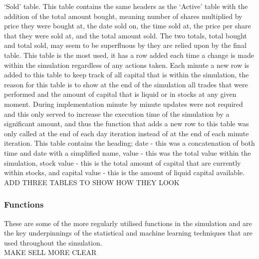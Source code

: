 \documentclass[12pt,a4paper]{article}
\begin{document}
`Sold' table. This table contains the same headers as the `Active' table with the addition of the total amount bought, meaning number of shares multiplied by price they were bought at, the date sold on, the time sold at, the price per share that they were sold at, and the total amount sold. The two totals, total bought and total sold, may seem to be superfluous by they are relied upon by the final table. This table is the most used, it has a row added each time a change is made within the simulation regardless of any actions taken. Each minute a new row is added to this table to keep track of all capital that is within the simulation, the reason for this table is to show at the end of the simulation all trades that were performed and the amount of capital that is liquid or in stocks at any given moment. During implementation minute by minute updates were not required and this only served to increase the execution time of the simulation by a significant amount, and thus the function that adds a new row to this table was only called at the end of each day iteration instead of at the end of each minute iteration. This table contains the heading; date - this was a concatenation of both time and date with a simplified name, value - this was the total value within the simulation, stock value - this is the total amount of capital that are currently within stocks, and capital value - this is the amount of liquid capital available. \\

ADD THREE TABLES TO SHOW HOW THEY LOOK\\
\fi

\subsubsection{Functions}

These are some of the more regularly utilised functions in the simulation and are the key underpinnings of the statistical and machine learning techniques that are used throughout the simulation. \\

MAKE SELL MORE CLEAR \\
\end{document}
